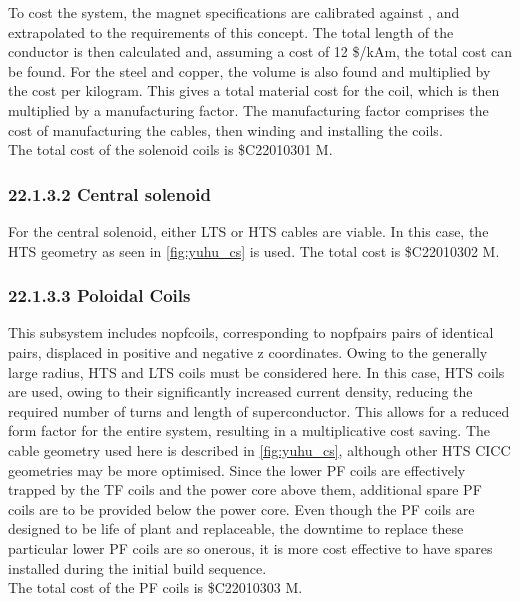To cost the system, the magnet specifications are calibrated against \cite{Menard2016}, and extrapolated to the requirements of this concept. The total length of the conductor is then calculated and, assuming a cost of 12 \$/kAm, the total cost can be found. For the steel and copper, the volume is also found and multiplied by the cost per kilogram. This gives a total material cost for the coil, which is then multiplied by a manufacturing factor. The manufacturing factor comprises the cost of manufacturing the cables, then winding and installing the coils. \\

The total cost of the solenoid coils is \$C22010301 M.

\subsubsection*{22.1.3.2 Central solenoid}

For the central solenoid, either LTS or HTS cables are viable. In this case, the HTS geometry as seen in \ref{fig:yuhu_cs} is used. The total cost is \$C22010302 M.

\subsubsection*{22.1.3.3 Poloidal Coils}

This subsystem includes nopfcoils, corresponding to nopfpairs pairs of identical pairs, displaced in positive and negative z coordinates. Owing to the generally large radius, HTS and LTS coils must be considered here. In this case, HTS coils are used, owing to their significantly increased current density, reducing the required number of turns and length of superconductor. This allows for a reduced form factor for the entire system, resulting in a multiplicative cost saving. The cable geometry used here is described in \ref{fig:yuhu_cs}, although other HTS CICC geometries may be more optimised.
Since the lower PF coils are effectively trapped by the TF coils and the power core above them, additional spare PF coils are to be provided below the power core. Even though the PF coils are designed to be life of plant and replaceable, the downtime to replace these particular lower PF coils are so onerous, it is more cost effective to have spares installed during the initial build sequence.  \\

The total cost of the PF coils is \$C22010303 M. \\

